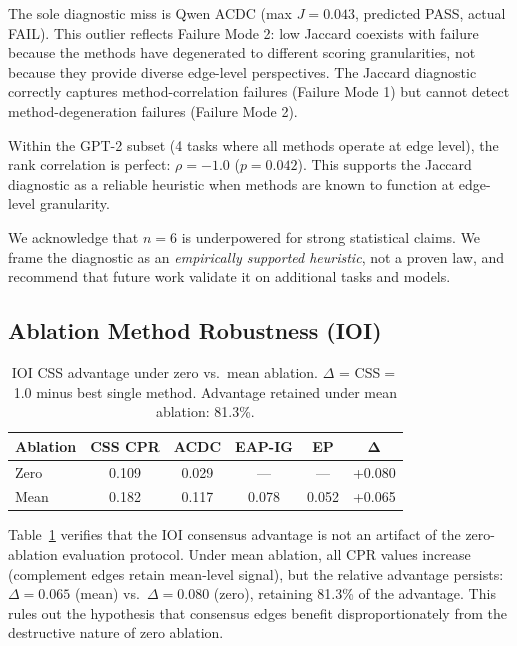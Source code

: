\documentclass[11pt,a4paper]{article}
\newcommand{\cpr}{\textsc{CPR}}
\begin{document}
The sole diagnostic miss is Qwen ACDC (max $J = 0.043$, predicted PASS, actual FAIL). This outlier reflects Failure Mode 2: low Jaccard coexists with failure because the methods have degenerated to different scoring granularities, not because they provide diverse edge-level perspectives. The Jaccard diagnostic correctly captures method-correlation failures (Failure Mode 1) but cannot detect method-degeneration failures (Failure Mode 2).

Within the GPT-2 subset (4 tasks where all methods operate at edge level), the rank correlation is perfect: $\rho = -1.0$ ($p = 0.042$). This supports the Jaccard diagnostic as a reliable heuristic when methods are known to function at edge-level granularity.

We acknowledge that $n=6$ is underpowered for strong statistical claims. We frame the diagnostic as an \emph{empirically supported heuristic}, not a proven law, and recommend that future work validate it on additional tasks and models.

\subsection{Ablation Method Robustness (IOI)}
\label{sec:ablation-robustness}

\begin{table}[t]
\centering
\small
\begin{tabular}{lccccc}
\toprule
\textbf{Ablation} & \textbf{CSS \cpr{}} & \textbf{ACDC} & \textbf{EAP-IG} & \textbf{EP} & $\boldsymbol{\Delta}$ \\
\midrule
Zero & 0.109 & 0.029 & --- & --- & +0.080 \\
Mean & 0.182 & 0.117 & 0.078 & 0.052 & +0.065 \\
\bottomrule
\end{tabular}
\caption{IOI CSS advantage under zero vs.\ mean ablation. $\Delta$ = CSS$=$1.0 minus best single method. Advantage retained under mean ablation: 81.3\%.}
\label{tab:ablation-robustness}
\end{table}

Table~\ref{tab:ablation-robustness} verifies that the IOI consensus advantage is not an artifact of the zero-ablation evaluation protocol. Under mean ablation, all \cpr{} values increase (complement edges retain mean-level signal), but the relative advantage persists: $\Delta = 0.065$ (mean) vs.\ $\Delta = 0.080$ (zero), retaining 81.3\% of the advantage. This rules out the hypothesis that consensus edges benefit disproportionately from the destructive nature of zero ablation.
\end{document}
